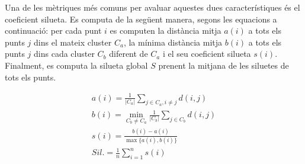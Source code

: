 \documentclass[CAT,BIB]{TFUOC}%
\begin{document}
%
%
%


            Una de les mètriques més comuns
            per avaluar aquestes dues característiques
            és el coeficient silueta.
            Es computa de la següent manera,
            segons les equacions a continuació:
            per cada punt $i$ es computen
            la distància mitja $a(i)$ a tots els punts $j$ dins el mateix cluster $C_a$,
            la mínima distància mitja $b(i)$ a tots els punts $j$ dins cada cluster $C_b$ diferent de $C_a$
            i el seu coeficient silueta $s(i)$.
            Finalment, es computa la silueta global $S$
            prenent la mitjana de les siluetes de tots els punts.

            \begin{gather}
                a(i) = \frac{1}{|C_a|}
                \sum_{j \in C_a, i \neq j} d(i,j)
                \\
                b(i) = \min_{C_b \neq C_a}
                \frac{1}{|C_b|}
                \sum_{j \in C_b} d(i,j)
                \\
                s(i) = \frac
                {b(i) - a(i)}
                {\max \{a(i), b(i)\}}
                \\
                \label{eq:sil}
                Sil. = \frac{1}{n}
                \sum_{i=1}^{n} s(i)
            \end{gather}
\end{document}
